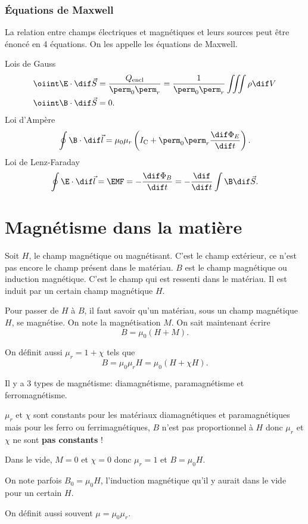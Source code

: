 \section{Équations de Maxwell}
La relation entre champs électriques et magnétiques et
leurs sources peut être énoncé en 4 équations.
On les appelle les équations de Maxwell.

Lois de Gauss
\begin{align*}
  \oiint \E \cdot \dif \vec S &= \frac{Q_\mathrm{encl}}{\perm_0\perm_r}
  = \frac{1}{\perm_0\perm_r}\iiint \rho \dif V\\
  \oiint \B \cdot \dif \vec S &= 0.
\end{align*}
Loi d'Ampère
\[ \oint \B \cdot \dif \vec l =
\mu_0\mu_r \left(I_\mathrm{C} + \perm_0\perm_r \frac{\dif \Phi_E}{\dif t}\right). \]
Loi de Lenz-Faraday
\[ \oint \E \cdot \dif \vec l = \EMF = - \frac{\dif \Phi_B}{\dif t}
= - \frac{\dif}{\dif t}\int \B \dif \vec S. \]

\part{Magnétisme dans la matière}
Soit $H$, le champ magnétique ou magnétisant.
C'est le champ extérieur,
ce n'est pas encore le champ présent dans le matériau.
$B$ est le champ magnétique ou induction magnétique.
C'est le champ qui est ressenti dans le matériau.
Il est induit par un certain champ magnétique $H$.

Pour passer de $H$ à $B$,
il faut savoir qu'un matériau,
sous un champ magnétique $H$, se magnétise.
On note la magnétisation $M$.
On sait maintenant écrire
\[ B = \mu_0 (H + M). \]

On définit aussi $\mu_r = 1 + \chi$ tels que
\[ B = \mu_0\mu_r H = \mu_0 (H + \chi H). \]

Il y a 3 types de magnétisme: diamagnétisme, paramagnétisme et ferromagnétisme.

$\mu_r$ et $\chi$ sont constants pour les matériaux diamagnétiques et
paramagnétiques mais pour les ferro ou ferrimagnétiques,
$B$ n'est pas proportionnel à $H$ donc
$\mu_r$ et $\chi$ ne sont \textbf{pas constants} !

Dans le vide, $M = 0$ et $\chi = 0$ donc $\mu_r = 1$ et $B = \mu_0 H$.

On note parfois $B_0 = \mu_0 H$,
l'induction magnétique qu'il y aurait dans le vide pour un certain $H$.

On définit aussi souvent $\mu = \mu_0 \mu_r$.

